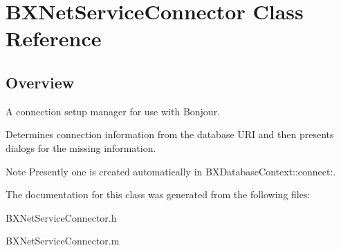 \hypertarget{interface_b_x_net_service_connector}{}\section{B\+X\+Net\+Service\+Connector Class Reference}
\label{interface_b_x_net_service_connector}


\subsection{Overview}
A connection setup manager for use with Bonjour. 

Determines connection information from the database U\+R\+I and then presents dialogs for the missing information. \begin{DoxyNote}{Note}
Presently one is created automatically in B\+X\+Database\+Context\+::connect\+:. 
\end{DoxyNote}


The documentation for this class was generated from the following files\+:\begin{DoxyCompactItemize}
\item 
B\+X\+Net\+Service\+Connector.\+h\item 
B\+X\+Net\+Service\+Connector.\+m\end{DoxyCompactItemize}
